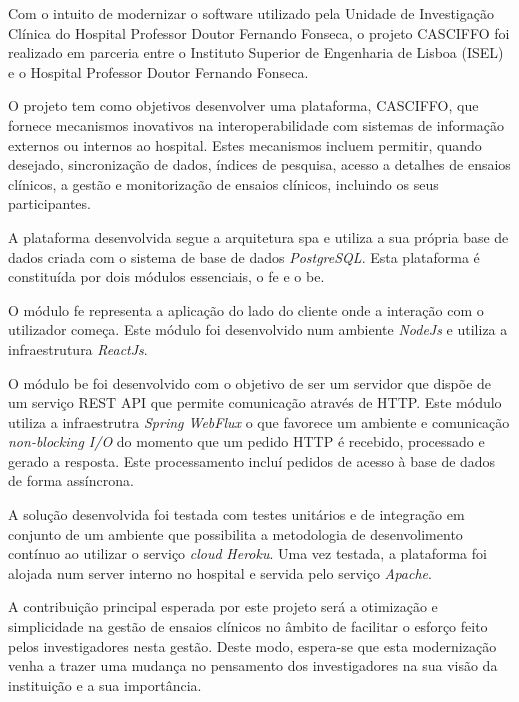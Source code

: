 \abstractPT  %

Com o intuito de modernizar o software utilizado pela Unidade de Investigação Clínica do Hospital Professor Doutor Fernando Fonseca, o projeto CASCIFFO foi realizado em parceria entre o Instituto Superior de Engenharia de Lisboa (ISEL) e o Hospital Professor Doutor Fernando Fonseca. 

O projeto tem como objetivos desenvolver uma plataforma, CASCIFFO, que fornece mecanismos inovativos na interoperabilidade com sistemas de informação externos ou internos ao hospital. Estes mecanismos incluem permitir, quando desejado, sincronização de dados, índices de pesquisa, acesso a detalhes de ensaios clínicos, a gestão e monitorização de ensaios clínicos, incluindo os seus participantes.

A plataforma desenvolvida segue a arquitetura \acrfull{spa} e utiliza a sua própria base de dados criada com o sistema de base de dados \textit{PostgreSQL}. Esta plataforma é constituída por dois módulos essenciais, o \acrfull{fe} e o \acrfull{be}.

O módulo \acrshort{fe} representa a aplicação do lado do cliente onde a interação com o utilizador começa. Este módulo foi desenvolvido num ambiente \textit{NodeJs} e utiliza a infraestrutura \textit{ReactJs}.

O módulo \acrshort{be} foi desenvolvido com o objetivo de ser um servidor que dispõe de um serviço REST API que permite comunicação através de HTTP. Este módulo utiliza a infraestrutra \textit{Spring WebFlux} o que favorece um ambiente e comunicação \textit{non-blocking I/O} do momento que um pedido HTTP é recebido, processado e gerado a resposta. Este processamento incluí pedidos de acesso à base de dados de forma assíncrona.

A solução desenvolvida foi testada com testes unitários e de integração em conjunto de um ambiente que possibilita a metodologia de desenvolimento contínuo ao utilizar o serviço \textit{cloud} \textit{Heroku}. 
Uma vez testada, a plataforma foi alojada num server interno no hospital e servida pelo serviço \textit{Apache}.

A contribuição principal esperada por este projeto será a otimização e simplicidade na gestão de ensaios clínicos no âmbito de facilitar o esforço feito pelos investigadores nesta gestão.
Deste modo, espera-se que esta modernização venha a trazer uma mudança no pensamento dos investigadores na sua visão da instituição e a sua importância.

